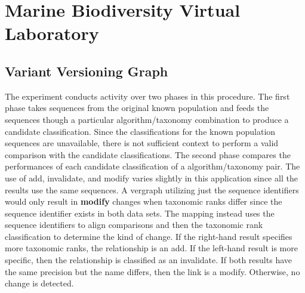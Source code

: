 \section{Marine Biodiversity Virtual Laboratory}

\subsection{Variant Versioning Graph}

The experiment conducts activity over two phases in this procedure.
The first phase takes sequences from the original known population and feeds the sequences though a particular algorithm/taxonomy combination to produce a candidate classification.
Since the classifications for the known population sequences are unavailable, there is not sufficient context to perform a valid comparison with the candidate classifications.
The second phase compares the performances of each candidate classification of a algorithm/taxonomy pair.
The use of \gls{add}, \gls{invalidate}, and \gls{modify} varies slightly in this application since all the results use the same sequences.
A \gls{vergraph} utilizing just the sequence identifiers would only result in \textbf{modify} changes when taxonomic ranks differ since the sequence identifier exists in both data sets.
The mapping instead uses the sequence identifiers to align comparisons and then the taxonomic rank classification to determine the kind of \gls{change}.
If the right-hand result specifies more taxonomic ranks, the relationship is an \gls{add}.
If the left-hand result is more specific, then the relationship is classified as an \gls{invalidate}.
If both results have the same precision but the name differs, then the link is a \gls{modify}.
Otherwise, no \gls{change} is detected.

